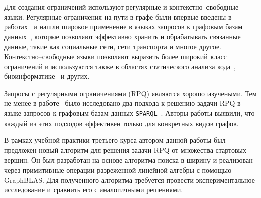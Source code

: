 Для создания ограничений используют регулярные и контекстно--свободные языки. Регулярные ограничения на пути в графе были впервые введены в работах~\cite{intro_rpq_term_appear1, intro_rpq_term_appear2} и нашли широкое применение в языках запросов к графовым базам данных~\cite{intro_rpq_massive_graphs}, которые позволяют эффективно хранить и обрабатывать связанные данные, такие как социальные сети, сети транспорта и многое другое. Контекстно--свободные языки позволяют выразить более широкий класс ограничений и используются также в областях статического анализа кода~\cite{intro_cfpq_code_analysis}, биоинформатике~\cite{intro_cfpq_bioinformatics} и других.

Запросы с регулярными ограничениями (RPQ) являются хорошо изучеными. Тем не менее в работе~\cite{intro_rpq_ineffective} было исследовано два подхода к решению задачи RPQ в языке запросов к графовым базам данных \verb|SPARQL|~\cite{intro_sparql}. Авторы работы выявили, что каждый из этих подходов эффективен только для конкретных видов графов.

В рамках учебной практики третьего курса автором данной работы был предложен новый алгоритм для решения задачи RPQ от множества стартовых вершин. Он был разработан на основе алгоритма поиска в ширину и реализован через примитивные операции разреженной линейной алгебры с помощью GraphBLAS. Для полученного алгоритма требуется провести экспериментальное исследование и сравнить его с аналогичными решениями.
